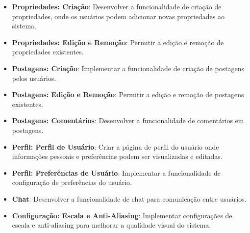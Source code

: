 \documentclass[../main.tex]{subfiles}
\begin{document}
\begin{itemize}
    \item \textbf{Propriedades: Criação}: Desenvolver a funcionalidade de criação de propriedades, onde os usuários podem adicionar novas propriedades ao sistema.
    \item \textbf{Propriedades: Edição e Remoção}: Permitir a edição e remoção de propriedades existentes.
    \item \textbf{Postagens: Criação}: Implementar a funcionalidade de criação de postagens pelos usuários.
    \item \textbf{Postagens: Edição e Remoção}: Permitir a edição e remoção de postagens existentes.
    \item \textbf{Postagens: Comentários}: Desenvolver a funcionalidade de comentários em postagens.
    \item \textbf{Perfil: Perfil de Usuário}: Criar a página de perfil do usuário onde informações pessoais e preferências podem ser visualizadas e editadas.
    \item \textbf{Perfil: Preferências de Usuário}: Implementar a funcionalidade de configuração de preferências do usuário.
    \item \textbf{Chat}: Desenvolver a funcionalidade de chat para comunicação entre usuários.
    \item \textbf{Configuração: Escala e Anti-Aliasing}: Implementar configurações de escala e anti-aliasing para melhorar a qualidade visual do sistema.
\end{itemize}

\end{document}

